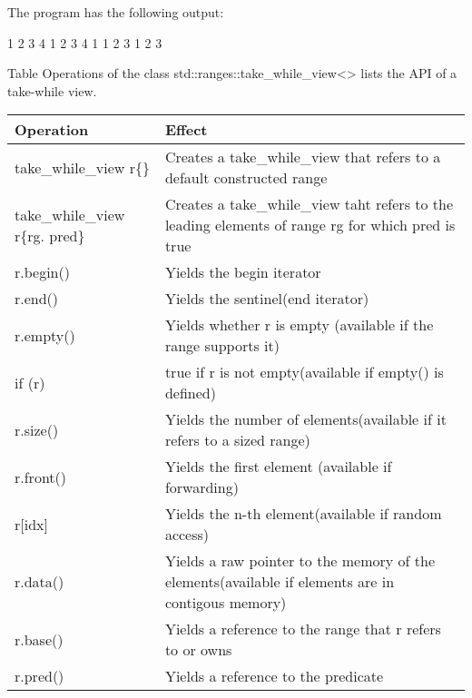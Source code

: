 The program has the following output:

\begin{shell}
1 2 3 4 1 2 3 4 1
1 2 3
1 2 3
\end{shell}


Table Operations of the class std::ranges::take\_while\_view<> lists the API of a take-while view.

\begin{longtable}[c]{|l|l|}
\hline
\textbf{Operation} & \textbf{Effect}                                                        \\ \hline
\endfirsthead
%
\endhead
%
take\_while\_view r\{\}         & Creates a take\_while\_view that refers to a default constructed range                             \\ \hline
take\_while\_view r\{rg. pred\} & Creates a take\_while\_view taht refers to the leading elements of range rg for which pred is true \\ \hline
r.begin()          & Yields the begin iterator                                              \\ \hline
r.end()            & Yields the sentinel(end iterator)                                      \\ \hline
r.empty()          & Yields whether r is empty (available if the range supports it)         \\ \hline
if (r)             & true if r is not empty(available if empty() is defined)                \\ \hline
r.size()           & Yields the number of elements(available if it refers to a sized range) \\ \hline
r.front()          & Yields the first element (available if forwarding)                     \\ \hline
r{[}idx{]}         & Yields the n-th element(available if random access)                    \\ \hline
r.data()                        & Yields a raw pointer to the memory of the elements(available if elements are in contigous memory)  \\ \hline
r.base()           & Yields a reference to the range that r refers to or owns               \\ \hline
r.pred()           & Yields a reference to the predicate                                    \\ \hline
\end{longtable}

